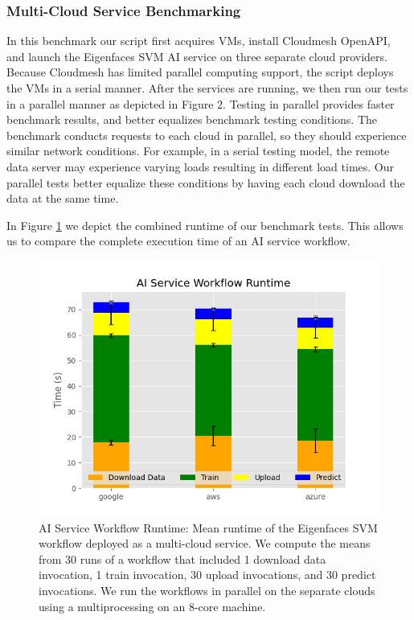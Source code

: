 \subsubsection{Multi-Cloud Service
Benchmarking}\label{multi-cloud-service-benchmarking}

In this benchmark our script first acquires VMs, install Cloudmesh
OpenAPI, and launch the Eigenfaces SVM AI service on three separate
cloud providers. Because Cloudmesh has limited parallel computing
support, the script deploys the VMs in a serial manner. After the
services are running, we then run our tests in a parallel manner as
depicted in Figure 2. Testing in parallel provides faster benchmark
results, and better equalizes benchmark testing conditions. The
benchmark conducts requests to each cloud in parallel, so they should
experience similar network conditions. For example, in a serial testing
model, the remote data server may experience varying loads resulting in
different load times. Our parallel tests better equalize these
conditions by having each cloud download the data at the same time.

In Figure \ref{fig:7} we depict the combined runtime of our benchmark tests. This
allows us to compare the complete execution time of an AI service
workflow.

\begin{figure}
\centering
\includegraphics[width=\columnwidth]{../images/ai_service_workflow_runtime.png}
\caption{AI Service Workflow Runtime: Mean runtime of the Eigenfaces SVM workflow deployed
as a multi-cloud service. We compute the means from 30 runs of a
workflow that included 1 download data invocation, 1 train invocation,
30 upload invocations, and 30 predict invocations. We run the workflows
in parallel on the separate clouds using a multiprocessing on an 8-core
machine.}
\label{fig:7}
\end{figure}


